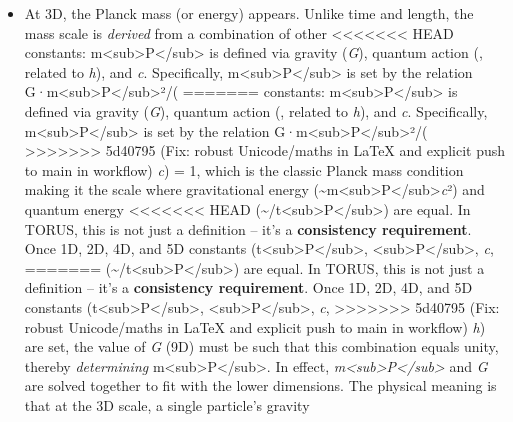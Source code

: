 \documentclass[]{article}
\begin{document}
{{\begin{itemize}
  consistent space-time pair. In other words, \emph{c} (4D) acts as a
  conversion factor ensuring the 1D and 2D anchors are mutually
  compatible -- a foundational check that the recursion's base is solid.
\item
  At 3D, the Planck mass (or energy) appears. Unlike time and length,
  the mass scale is \emph{derived} from a combination of other
<<<<<<< HEAD
  constants: m\textless sub\textgreater P\textless/sub\textgreater{} is
  defined via gravity (\emph{G}), quantum action (\emph{\hbar}, related to
  \emph{h}), and \emph{c}. Specifically,
  m\textless sub\textgreater P\textless/sub\textgreater{} is set by the
  relation
  G·m\textless sub\textgreater P\textless/sub\textgreater²/(\emph{\hbar}
=======
  constants: m\textless{}sub\textgreater{}P\textless{}/sub\textgreater{}
  is defined via gravity (\emph{G}), quantum action (\emph{\hbar}, related
  to \emph{h}), and \emph{c}. Specifically,
  m\textless{}sub\textgreater{}P\textless{}/sub\textgreater{} is set by
  the relation
  G·m\textless{}sub\textgreater{}P\textless{}/sub\textgreater{}²/(\emph{\hbar}
>>>>>>> 5d40795 (Fix: robust Unicode/maths in LaTeX and explicit push to main in workflow)
  \emph{c}) = 1, which is the classic Planck mass condition making it
  the scale where gravitational energy
  (\textasciitilde{}m\textless{}sub\textgreater{}P\textless{}/sub\textgreater{}\emph{c}²)
  and quantum energy
<<<<<<< HEAD
  (\textasciitilde \hbar/t\textless sub\textgreater P\textless/sub\textgreater)
  are equal. In TORUS, this is not just a definition -- it's a
  \textbf{consistency requirement}. Once 1D, 2D, 4D, and 5D constants
  (t\textless sub\textgreater P\textless/sub\textgreater,
  \ell\textless sub\textgreater P\textless/sub\textgreater, \emph{c},
=======
  (\textasciitilde{}\hbar/t\textless{}sub\textgreater{}P\textless{}/sub\textgreater{})
  are equal. In TORUS, this is not just a definition -- it's a
  \textbf{consistency requirement}. Once 1D, 2D, 4D, and 5D constants
  (t\textless{}sub\textgreater{}P\textless{}/sub\textgreater{},
  \ell\textless{}sub\textgreater{}P\textless{}/sub\textgreater{}, \emph{c},
>>>>>>> 5d40795 (Fix: robust Unicode/maths in LaTeX and explicit push to main in workflow)
  \emph{h}) are set, the value of \emph{G} (9D) must be such that this
  combination equals unity​, thereby \emph{determining}
  m\textless{}sub\textgreater{}P\textless{}/sub\textgreater{}. In
  effect,
  \emph{m\textless{}sub\textgreater{}P\textless{}/sub\textgreater{}} and
  \emph{G} are solved together to fit with the lower dimensions. The
  physical meaning is that at the 3D scale, a single particle's gravity

\end{itemize}}}
\end{document}
